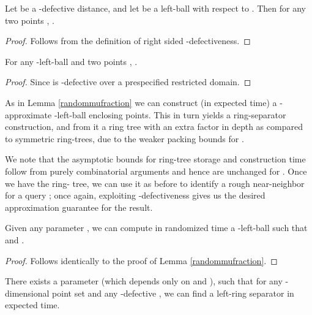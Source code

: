 \documentclass[11pt]{myclass}
\begin{document}
\begin{lemma} \label{leftcircle}
Let  be a -defective distance, and let  be a left-ball with respect to . Then for any two points , .
\end{lemma}

 \begin{proof}
 Follows from the definition of right sided -defectiveness.
  
 \end{proof}
 
 \begin{corollary}
 For any -left-ball  and two points ,
 . 
 \end{corollary}
\begin{proof}
Since  is -defective over a prespecified restricted domain.
\end{proof}

As in Lemma \ref{randommufraction} we can construct  (in  expected time) a -approximate -left-ball 
enclosing  points. This in turn yields a ring-separator construction, 
and from it a ring tree with an extra  factor in depth as compared to
symmetric ring-trees, due to the weaker packing bounds for .

 We note that the asymptotic bounds for ring-tree storage and construction time follow from purely combinatorial arguments
 and hence are unchanged for . 
Once we have the ring- tree, we can use it as before to identify a rough near-neighbor for a query ;
 once again, exploiting -defectiveness gives us the desired approximation guarantee for the result.

 \begin{lemma} \label{randommufractionassym}
 Given any parameter , we can compute in   randomized time a -left-ball  such that  and .
\end{lemma}  

\begin{proof}
 Follows identically to the proof of Lemma \ref{randommufraction}.
\end{proof}


\begin{lemma}\label{ringassym}
There exists a parameter  (which depends only on  and ), such that for any -dimensional point set  and any -defective , we can find a  left-ring separator 
in  expected time.
\end{lemma}
 
\end{document}
